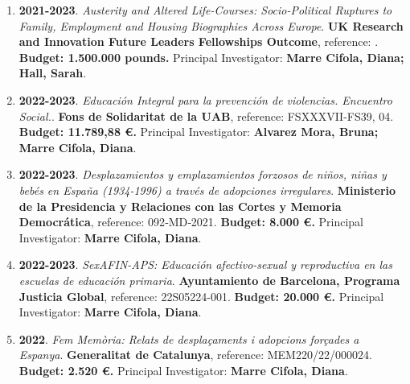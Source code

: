 \begin{enumerate}
\item {\bf 2021-2023}. {\it Austerity and Altered Life-Courses: Socio-Political Ruptures to Family, Employment and Housing Biographies Across Europe}. {\bf UK Research and Innovation Future Leaders Fellowships Outcome},  reference: . {\bf  Budget: 1.500.000 pounds.} Principal Investigator: {\bf Marre Cifola, Diana; Hall, Sarah}.\filbreak
\item {\bf 2022-2023}. {\it Educación Integral para la prevención de violencias. Encuentro Social.}. {\bf Fons de Solidaritat de la UAB},  reference: FSXXXVII-FS39, 04. {\bf  Budget: 11.789,88 €.} Principal Investigator: {\bf Alvarez Mora, Bruna; Marre Cifola, Diana}.\filbreak
\item {\bf 2022-2023}. {\it Desplazamientos y emplazamientos forzosos de niños, niñas y bebés en España (1934‐1996) a través de adopciones irregulares}. {\bf Ministerio de la Presidencia y Relaciones con las Cortes y Memoria Democrática},  reference: 092‐MD‐2021. {\bf  Budget: 8.000 €.} Principal Investigator: {\bf Marre Cifola, Diana}.\filbreak
\item {\bf 2022-2023}. {\it SexAFIN-APS: Educación afectivo-sexual y reproductiva en las escuelas de educación primaria}. {\bf Ayuntamiento de Barcelona, Programa Justicia Global},  reference: 22S05224-001. {\bf  Budget: 20.000 €.} Principal Investigator: {\bf Marre Cifola, Diana}.\filbreak
\item {\bf 2022}. {\it Fem Memòria: Relats de desplaçaments i adopcions forçades a Espanya}. {\bf Generalitat de Catalunya},  reference: MEM220/22/000024. {\bf  Budget: 2.520 €.} Principal Investigator: {\bf Marre Cifola, Diana}.\filbreak
\end{enumerate} 
